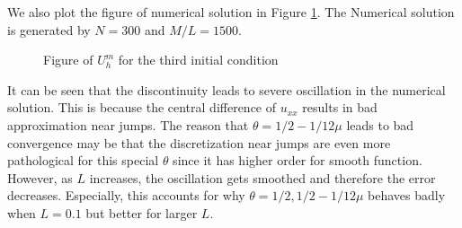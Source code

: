 \documentclass[english, nochinese]{pnote}
\begin{document}
We also plot the figure of numerical solution in Figure \ref{Fig:NumSol3}. The Numerical solution is generated by $ N = 300 $ and $ M / L = 1500 $.

\begin{figure}
\centering

\caption{Figure of $U_h^m$ for the third initial condition}
\label{Fig:NumSol3}
\end{figure}

It can be seen that the discontinuity leads to severe oscillation in the numerical solution. This is because the central difference of $ u_{ x x } $ results in bad approximation near jumps. The reason that $ \theta = 1 / 2 - 1 / 12 \mu $ leads to bad convergence may be that the discretization near jumps are even more pathological for this special $\theta$ since it has higher order for smooth function. However, as $L$ increases, the oscillation gets smoothed and therefore the error decreases. Especially, this accounts for why $ \theta = 1 / 2, 1 / 2 - 1 / 12 \mu $ behaves badly when $ L = 0.1 $ but better for larger $L$.
\end{document}
